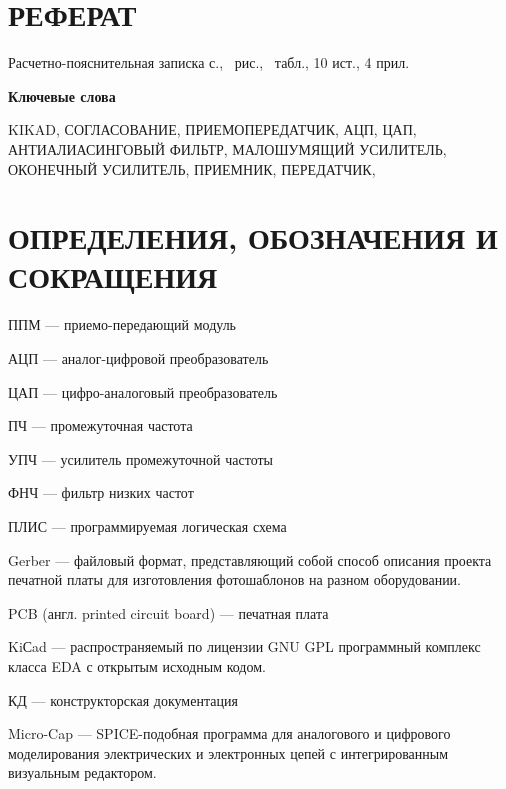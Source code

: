 \documentclass[utf8x, 14pt, oneside, a4paper]{article}
\begin{document}
	\normalsize
	\setcounter{page}{2}
	
	
	\section*{РЕФЕРАТ}
	\begin{center}
		Расчетно-пояснительная записка \pageref{LastPage} с., \totalfigures\ рис., \totaltables\ табл., 10 ист., 4 прил.
		
		\textbf{Ключевые слова}
	\end{center}
	KIKAD,
	СОГЛАСОВАНИЕ,
	ПРИЕМОПЕРЕДАТЧИК,
	АЦП, ЦАП, АНТИАЛИАСИНГОВЫЙ ФИЛЬТР, МАЛОШУМЯЩИЙ УСИЛИТЕЛЬ,
	ОКОНЕЧНЫЙ УСИЛИТЕЛЬ, ПРИЕМНИК, ПЕРЕДАТЧИК, 
		
	
	
	\pagebreak
	
	\renewcommand{\contentsname}{\normalsize\bfseries\centering СОДЕРЖАНИЕ}
	\small
	\tableofcontents
	\normalsize
	
	\pagebreak
	
	\section*{ОПРЕДЕЛЕНИЯ, ОБОЗНАЧЕНИЯ И СОКРАЩЕНИЯ}
	
	ППМ --- приемо-передающий модуль
	
	АЦП --- аналог-цифровой преобразователь
	
	ЦАП --- цифро-аналоговый преобразователь 
	
	ПЧ --- промежуточная частота
	
	УПЧ --- усилитель промежуточной частоты
	
	ФНЧ --- фильтр низких частот
	
	ПЛИС --- программируемая логическая схема
	
	Gerber --- файловый формат, представляющий собой способ описания проекта печатной платы для изготовления фотошаблонов на разном оборудовании.
	
	PCB (англ. printed circuit board) --- печатная плата
	
	KiСad --- распространяемый по лицензии GNU GPL программный комплекс класса EDA с открытым исходным кодом.
	
	КД --- конструкторская документация
	
	Micro-Cap --- SPICE-подобная программа для аналогового и цифрового моделирования электрических и электронных цепей с интегрированным визуальным редактором.
	
\end{document}
